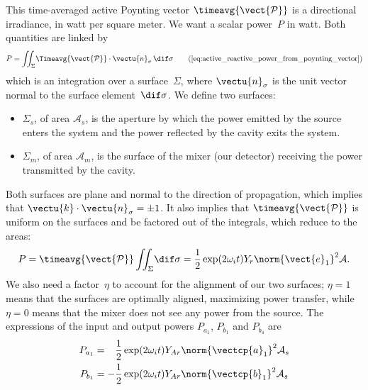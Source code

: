 \begin{refsection}
This time-averaged active Poynting vector $\timeavg{\vect{\mathcal{P}}}$ is a directional irradiance, in watt per square meter.
We want a scalar power~$P$ in watt.
Both quantities are linked by
\begin{equation}
    P
    =
    \iint_\Sigma
    \!
    \Timeavg{\vect{\mathcal{P}}}
    \cdot
    \vectu{n}_\sigma
    \,
    \dif\sigma
    \tag{\ref{eq:active_reactive_power_from_poynting_vector}}
\end{equation}
which is an integration over a surface~$\Sigma$, where $\vectu{n}_\sigma$ is the unit vector normal to the surface element~$\dif\sigma$.
We define two surfaces:
\begin{itemize}
    \item 
        $\Sigma_s$, of area $\mathcal{A}_s$,
        is the aperture by which the power emitted by the source enters the system
        and the power reflected by the cavity exits the system.
    \item
        $\Sigma_m$, of area $\mathcal{A}_m$,
        is the surface of the mixer (our detector) receiving the power transmitted by the cavity.
\end{itemize}
Both surfaces are plane and normal to the direction of propagation,
which implies that $\vectu{k}\cdot\vectu{n}_\sigma=\pm1$.
It also implies that $\timeavg{\vect{\mathcal{P}}}$ is uniform on the surfaces and be factored out of the integrals, which reduce to the areas:
\begin{equation}
    P
    =
    \timeavg{\vect{\mathcal{P}}}
    \iint_\Sigma
    \!
    \dif\sigma
    =
    \frac{1}{2}
    \exp(2\omega_i t)
    Y_r
    \norm{\vect{e}_1}^2
    \mathcal{A}
    \text{.}
\end{equation}
We also need a factor~$\eta$ to account for the alignment of our two surfaces;
$\eta=1$ means that the surfaces are optimally aligned, maximizing power transfer,
while $\eta=0$ means that the mixer does not see any power from the source.
The expressions of the input and output powers $P_{a_1}$, $P_{b_1}$ and $P_{b_4}$ are
\begin{align}
    P_{a_1}
    &=
    \phantom{\mathrel{-}}
    \frac{1}{2}
    \exp(2\omega_i t)
    Y_{Ar}
    \norm{\vectcp{a}_1}^2
    \mathcal{A}_s
    \\%
    P_{b_1}
    &=
    -
    \frac{1}{2}
    \exp(2\omega_i t)
    Y_{Ar}
    \norm{\vectcp{b}_1}^2
    \mathcal{A}_s
    \\%

\end{align}
\end{refsection}
